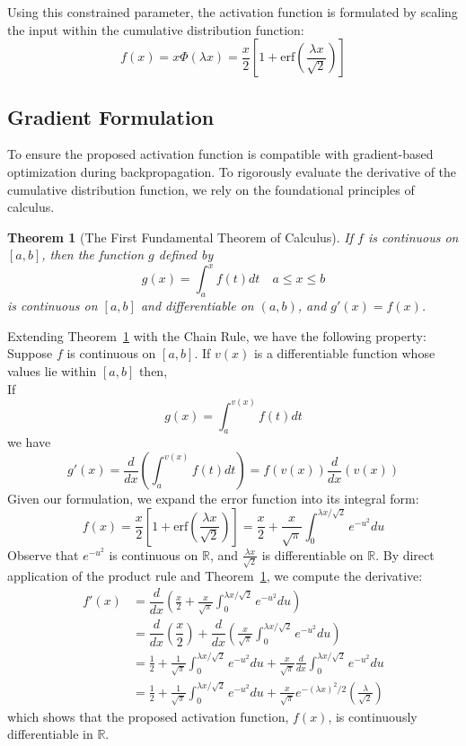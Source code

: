 \documentclass[11pt]{article}
\newtheorem{theorem}{Theorem}[section]
\begin{document}
\noindent Using this constrained parameter, the activation function is formulated by scaling the input within the cumulative distribution function:
\begin{equation*}
f(x) = x \Phi(\lambda x) = \dfrac{x}{2}\left[ 1 + \text{erf}\left(\dfrac{\lambda x}{\sqrt{2}}\right) \right]
\end{equation*}

\subsection{Gradient Formulation}
\noindent To ensure the proposed activation function is compatible with gradient-based optimization during backpropagation. To rigorously evaluate the derivative of the cumulative distribution function, we rely on the foundational principles of calculus.
\begin{theorem}[The First Fundamental Theorem of Calculus] 
If $f$ is continuous on $[a,b]$, then the function $g$ defined by
\begin{equation*}
g(x) = \int_{a}^{x}f(t)dt \quad a \leq x \leq b
\end{equation*}
is continuous on $[a,b]$ and differentiable on $(a,b)$, and $g'(x) = f(x)$.
\label{FFTC}
\end{theorem}
\noindent Extending Theorem~\ref{FFTC} with the Chain Rule, we have the following property: Suppose $f$ is continuous on $[a,b]$. If $v(x)$ is a differentiable function whose values lie within $[a,b]$ then,\\

\noindent If
$$
g(x) = \displaystyle\int_{a}^{v(x)} f(t)dt
$$
we have
$$
g'(x) = \dfrac{d}{dx}\left(  \displaystyle\int_{a}^{v(x)} f(t)dt\right) = f(v(x))\dfrac{d}{dx}(v(x))
$$
\noindent Given our formulation, we expand the error function into its integral form:
\begin{equation*}
f(x) = \frac{x}{2} \left[ 1 + \text{erf}\left( \frac{\lambda x}{\sqrt{2}}\right)\right] = \frac{x}{2} + \frac{x}{\sqrt{\pi}}\int_{0}^{\lambda x / \sqrt{2}} e^{-u^{2}}du
\end{equation*}
Observe that $e^{-u^{2}}$ is continuous on $\mathbb{R}$, and $\frac{\lambda x}{\sqrt{2}}$ is differentiable on $\mathbb{R}$. By direct application of the product rule and Theorem~\ref{FFTC}, we compute the derivative:
\begin{align*}
f'(x) &= \dfrac{d}{dx}\left( \frac{x}{2} + \frac{x}{\sqrt{\pi}}\int_{0}^{\lambda x / \sqrt{2}} e^{-u^{2}}du\right)\\ 
&= \dfrac{d}{dx}\left( \dfrac{x}{2}\right) + \dfrac{d}{dx} \left(  \frac{x}{\sqrt{\pi}}\int_{0}^{\lambda x / \sqrt{2}} e^{-u^{2}}du \right)\\
&=   \frac{1}{2} + \frac{1}{\sqrt{\pi}}\int_{0}^{\lambda x / \sqrt{2}} e^{-u^{2}}du + \frac{x}{\sqrt{\pi}}\frac{d}{dx}\int_{0}^{\lambda x / \sqrt{2}} e^{-u^{2}}du \\
&=   \frac{1}{2} + \frac{1}{\sqrt{\pi}}\int_{0}^{\lambda x / \sqrt{2}} e^{-u^{2}}du + \frac{x}{\sqrt{\pi}}e^{-(\lambda x)^{2} / 2}\left(\frac{\lambda}{\sqrt{2}}\right)
\end{align*}
\noindent which shows that the proposed activation function, $f(x)$, is continuously differentiable in $\mathbb{R}$.
\end{document}
